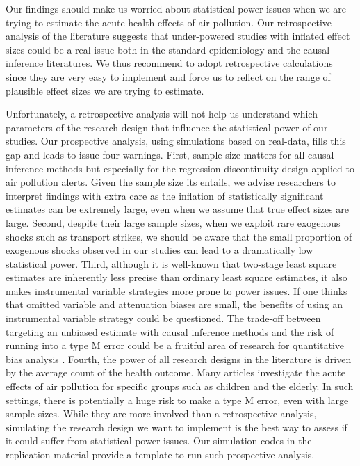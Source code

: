 \documentclass[12pt]{article}
\begin{document}
        Our findings should make us worried about statistical power issues when we are trying to estimate the acute health effects of air pollution. Our retrospective analysis of the literature suggests that under-powered studies with inflated effect sizes could be a real issue both in the standard epidemiology and the causal inference literatures. We thus recommend to adopt retrospective calculations since they are very easy to implement and force us to reflect on the range of plausible effect sizes we are trying to estimate. 

        Unfortunately, a retrospective analysis will not help us understand which parameters of the research design  that influence the statistical power of our studies. Our prospective analysis, using simulations based on real-data, fills this gap and leads to issue four warnings. First, sample size matters for all causal inference methods but especially for the regression-discontinuity design applied to air pollution alerts. Given the sample size its entails, we advise researchers to interpret findings with extra care as the inflation of statistically significant estimates can be extremely large, even when we assume that true effect sizes are large. Second, despite their large sample sizes, when we exploit rare exogenous shocks such as transport strikes, we should be aware that the small proportion of exogenous shocks observed in our studies can lead to a dramatically low statistical power. Third, although it is well-known that two-stage least square estimates are inherently less precise than ordinary least square estimates, it also makes instrumental variable strategies more prone to power issues. If one thinks that omitted variable and attenuation biases are small, the benefits of using an instrumental variable strategy could be questioned. The trade-off between targeting an unbiased estimate with causal inference methods and the risk of running into a type M error could be a fruitful area of research for quantitative bias analysis \citep{rosenbaum2010design, dorie2016flexible, vanderweele2017sensitivity, cinelli2020making}. Fourth, the power of all research designs in the literature is driven by the average count of the health outcome. Many articles investigate the acute effects of air pollution for specific groups such as children and the elderly. In such settings, there is potentially a huge risk to make a type M error, even with large sample sizes. While they are more involved than a retrospective analysis, simulating the research design we want to implement is the best way to assess if it could suffer from statistical power issues. Our simulation codes in the replication material provide a template to run such prospective analysis.
\end{document}
